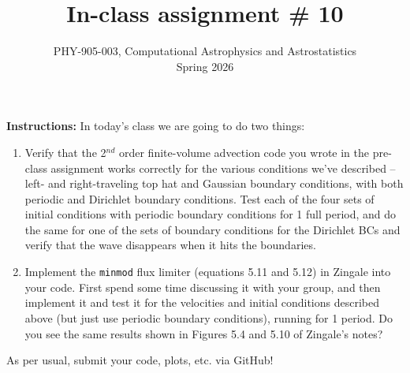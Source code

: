 \documentclass[10pt]{article}
\title{In-class assignment \# 10}
\author{PHY-905-003, Computational Astrophysics and
  Astrostatistics\\Spring 2026}
\date{} %
\begin{document}
 
\maketitle

\vspace{-5mm}


\noindent \textbf{Instructions:}  In today's class we are going to do
two things:

\begin{enumerate}

\item Verify that the 2$^{nd}$ order finite-volume advection code you
wrote in the pre-class assignment works correctly for the various
conditions we've described -- left- and right-traveling top hat and
Gaussian boundary conditions, with both periodic and Dirichlet
boundary conditions.  Test each of the four sets of initial conditions
with periodic boundary conditions for 1 full period, and do the same
for one of the sets of boundary conditions for the Dirichlet BCs and
verify that the wave disappears when it hits the boundaries.

\item Implement the \texttt{minmod} flux limiter (equations 5.11 and
5.12) in Zingale into your code.  First spend some time discussing it
with your group, and then implement it and test it for the velocities
and initial conditions described above (but just use periodic boundary
conditions), running for 1 period.  Do you see the same results shown
in Figures 5.4 and 5.10 of Zingale's notes?

\end{enumerate}

\vspace{5mm}
\noindent
As per usual, submit your code, plots, etc. via GitHub!
\end{document}
